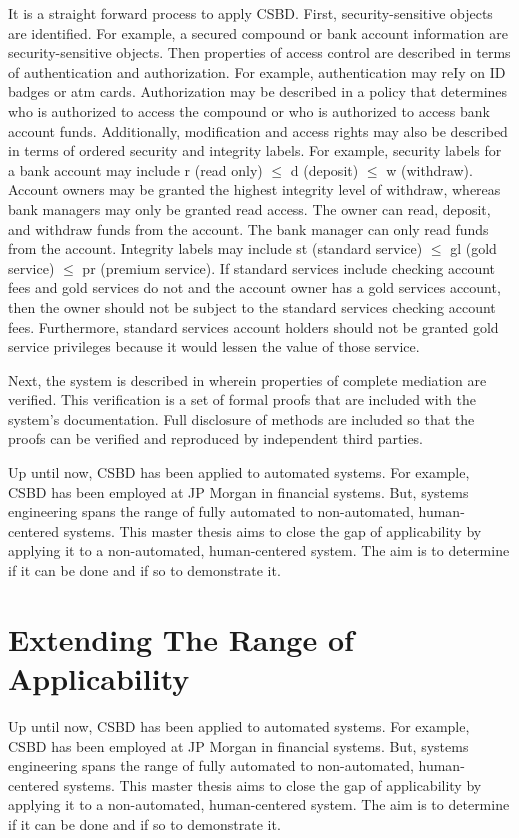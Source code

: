 \documentclass[../../main/main.tex]{subfiles}
\begin{document}
It is a straight forward process to apply CSBD.  First, security-sensitive objects are identified.  For example, a secured compound or bank account information are security-sensitive objects.  Then properties of access control are described in terms of authentication and authorization.  For example, authentication may reIy on ID badges or atm cards.   Authorization may be described in a policy that determines who is authorized to access the compound or who is authorized to access bank account funds.  Additionally, modification and access rights may also be described in terms of ordered security and integrity labels.  For example, security labels for a bank account may include r (read only) $\leq$ d (deposit) $\leq$  w (withdraw).  Account owners may be granted the highest integrity level of withdraw, whereas bank managers may only be granted read  access.   The owner can read, deposit, and withdraw funds from the account.  The bank manager can only read funds from the account.  Integrity labels may include st (standard service) $\leq$ gl (gold service) $\leq$ pr (premium service).  If standard services include checking account fees and gold services do not and the account owner has a gold services account, then the owner should not be subject to the standard services checking account fees.  Furthermore, standard services account holders should not be granted gold service privileges because it would lessen the value of those service.

 Next, the system is described in  wherein properties of complete mediation are verified.  This verification is a set of formal proofs that are included with the system's documentation.  Full disclosure of methods are included so that the proofs can be verified and reproduced by independent third parties.

Up until now, CSBD has been applied to automated systems.  For example, CSBD has  been employed at JP Morgan in financial systems.  But, systems engineering spans the range of fully automated to non-automated, human-centered systems.  This master thesis aims to close the gap of  applicability by applying it to a non-automated, human-centered system.  The aim is to determine if it can be done and if so to demonstrate it.


\section{Extending The Range of Applicability}\label{sec:intro:motivation}
Up until now, CSBD has been applied to automated systems.  For example, CSBD has  been employed at JP Morgan in financial systems.  But, systems engineering spans the range of fully automated to non-automated, human-centered systems.  This master thesis aims to close the gap of  applicability by applying it to a non-automated, human-centered system.  The aim is to determine if it can be done and if so to demonstrate it.
\end{document}
